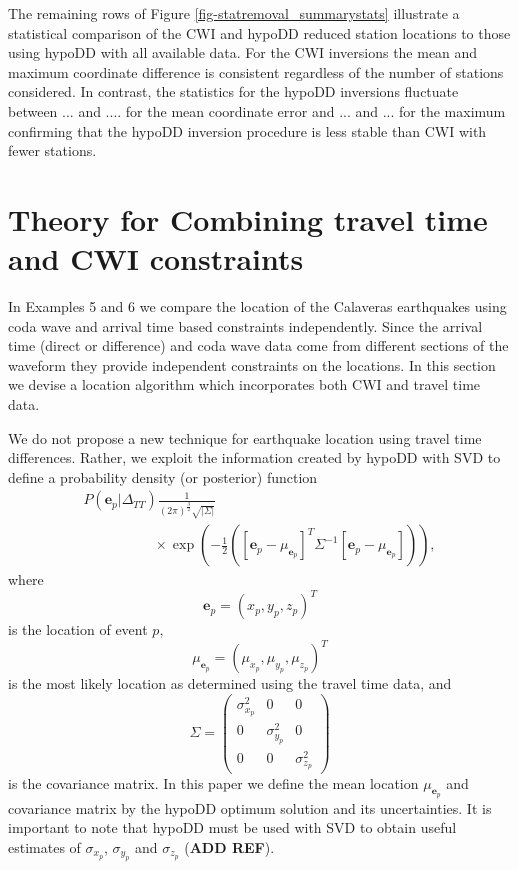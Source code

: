 \documentclass[extra]{gji}
\begin{document}
The remaining rows of Figure \ref{fig-statremoval_summarystats}
illustrate a statistical comparison of the CWI and hypoDD reduced
station locations to those using hypoDD with all available data. For
the CWI inversions the mean and maximum coordinate difference is
consistent regardless of the number of stations considered. In
contrast, the statistics for the hypoDD inversions fluctuate between
... and .... for the mean coordinate error and ... and ...  for the
maximum confirming that the hypoDD inversion procedure is less
stable than CWI with fewer stations.

\section{Theory for Combining travel time and CWI constraints}
\label{sec:CalaverasLoc-CWIandTT}
In Examples 5 and 6 we compare the location of the Calaveras
earthquakes using coda wave and arrival time based constraints
independently. Since the arrival time (direct or difference) and
coda wave data
 come from different sections of the waveform they provide independent constraints on the locations.
 In this section we devise a location algorithm which incorporates
 both CWI and travel time data.

We do not propose a new technique for earthquake location using
travel time differences. Rather, we exploit the information created
by hypoDD with SVD to define a probability density (or posterior)
function
\begin{equation}
\label{eq-multi-var-Gauss-tt} 
\begin{array}{l}
P(\mathbf{e}_p|\Delta_{TT}) 
\frac{1}{(2\pi)^{\frac{3}{2}}\sqrt{|\Sigma|}} \\
\hspace{5em} \times \exp
\left({-\frac{1}{2}\left([\mathbf{e}_p-\mu_{\mathbf{e}_p}]^T
\Sigma^{-1} [\mathbf{e}_p-\mu_{\mathbf{e}_p}]\right)} \right),
\end{array}
\end{equation}
where
\begin{equation}
\mathbf{e}_p = (x_p,y_p,z_p)^T
\end{equation}
is the location of event $p$,
\begin{equation}
\mu_{\mathbf{e}_p} = (\mu_{x_p}, \mu_{y_p},\mu_{z_p})^T
\end{equation}
is the most likely location as determined using the travel time
data, and
\begin{equation}
\label{eq:Sigma-expression}
\Sigma = \left( \begin{array}{ccc} \sigma_{x_p}^2 & 0 & 0\\
0 &  \sigma_{y_p}^2 & 0 \\
0 & 0 & \sigma_{z_p}^2  \end{array} \right)
\end{equation}
is the covariance matrix. In this paper we define the mean location
$\mu_{\mathbf{e}_p}$ and covariance matrix by the hypoDD optimum
solution and its uncertainties. It is important to note that hypoDD
must be used with SVD to obtain useful estimates of $\sigma_{x_p}$,
$\sigma_{y_p}$ and $\sigma_{z_p}$ (\textbf{ADD REF}).
\end{document}
